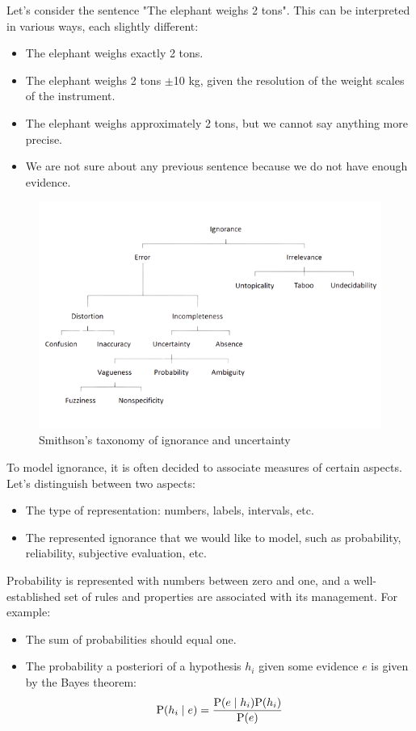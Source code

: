 \documentclass[12pt, a4paper]{report}
\begin{document}
    
    \begin{example}
        Let's consider the sentence "The elephant weighs 2 tons". This can be interpreted in various ways, each slightly different:
        \begin{itemize}
            \item The elephant weighs exactly 2 tons.
            \item The elephant weighs 2 tons $\pm$10 kg, given the resolution of the weight scales of the instrument.
            \item The elephant weighs approximately 2 tons, but we cannot say anything more precise.
            \item We are not sure about any previous sentence because we do not have enough evidence.
        \end{itemize}
    \end{example}
    \begin{figure}[H]
        \centering
        \includegraphics[width=0.75\linewidth]{images/smithson.png}
        \caption{Smithson's taxonomy of ignorance and uncertainty}
    \end{figure}
    To model ignorance, it is often decided to associate measures of certain aspects. Let's distinguish between two aspects:
    \begin{itemize}
        \item The type of representation: numbers, labels, intervals, etc.
        \item The represented ignorance that we would like to model, such as probability, reliability, subjective evaluation, etc.
    \end{itemize}
    Probability is represented with numbers between zero and one, and a well-established set of rules and properties are associated with its management. For example:
    \begin{itemize}
        \item The sum of probabilities should equal one.
        \item The probability a posteriori of a hypothesis $h_i$ given some evidence $e$ is given by the Bayes theorem:
            \[\textnormal{P}(h_i \mid e)=\dfrac{\textnormal{P}(e \mid h_i)\textnormal{P}(h_i)}{\textnormal{P}(e)}\]
    \end{itemize}
\end{document}
